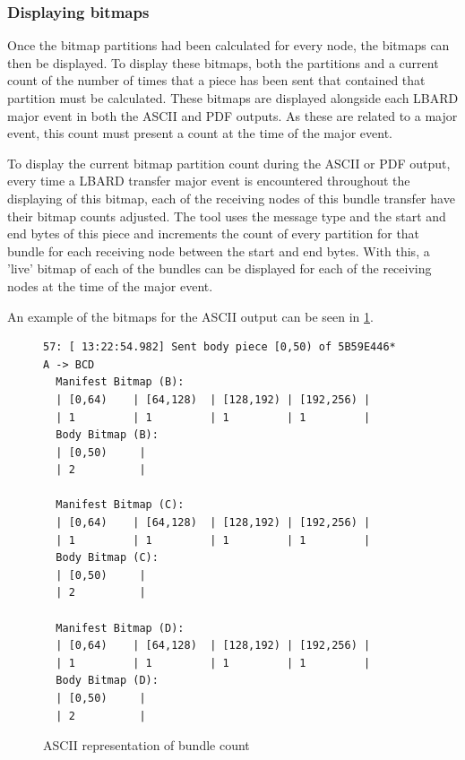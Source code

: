 \subsubsection{Displaying bitmaps}
Once the bitmap partitions had been calculated for every node, the bitmaps can then be displayed.
To display these bitmaps, both the partitions and a current count of the number of times that a piece has been sent that contained that partition must be calculated.
These bitmaps are displayed alongside each LBARD major event in both the ASCII and PDF outputs.
As these are related to a major event, this count must present a count at the time of the major event.

To display the current bitmap partition count during the ASCII or PDF output, every time a LBARD transfer major event is encountered throughout the displaying of this bitmap, each of the receiving nodes of this bundle transfer have their bitmap counts adjusted.
The tool uses the message type and the start and end bytes of this piece and increments the count of every partition for that bundle for each receiving node between the start and end bytes.
With this, a 'live' bitmap of each of the bundles can be displayed for each of the receiving nodes at the time of the major event.

An example of the bitmaps for the ASCII output can be seen in \figurename{ \ref{fig:chapter6ASCIIPartition}}.

\begin{figure}
    \begin{centering}
\begin{lstlisting}[basicstyle=\small, frame=single, breaklines]
57: [ 13:22:54.982] Sent body piece [0,50) of 5B59E446*
A -> BCD
  Manifest Bitmap (B):
  | [0,64)    | [64,128)  | [128,192) | [192,256) |
  | 1         | 1         | 1         | 1         |
  Body Bitmap (B):
  | [0,50)     |
  | 2          |
  
  Manifest Bitmap (C):
  | [0,64)    | [64,128)  | [128,192) | [192,256) |
  | 1         | 1         | 1         | 1         |
  Body Bitmap (C):
  | [0,50)     |
  | 2          |
  
  Manifest Bitmap (D):
  | [0,64)    | [64,128)  | [128,192) | [192,256) |
  | 1         | 1         | 1         | 1         |
  Body Bitmap (D):
  | [0,50)     |
  | 2          |
\end{lstlisting}
        \caption{ASCII representation of bundle count}
        \label{fig:chapter6ASCIIPartition}
    \end{centering}
\end{figure}

